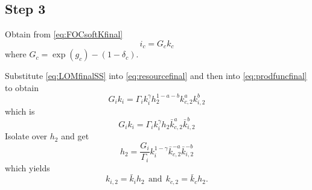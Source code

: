 \documentclass{article}
\begin{document}
\subsection*{Step 3}


Obtain from \ref{eq:FOCsoftKfinal}
\begin{equation}\label{eq:LOMfinalSS}
i_c = G_c k_c
\end{equation}
where $G_c = \exp(g_c) - (1 - \delta_c)$.

Substitute \ref{eq:LOMfinalSS} into \ref{eq:resourcefinal} and then into \ref{eq:prodfuncfinal} to obtain
$$
G_i k_i = \Gamma_{i} k_{i}^{\gamma} h_{2}^{1 - a- b} k_{c,2}^a k_{i,2}^b
$$
which is
$$
G_i k_i = \Gamma_{i} k_{i}^{\gamma} h_{2} \bar{k}_{c,2}^a \bar{k}_{i,2}^b
$$
Isolate over $h_2$ and get
\begin{equation}
h_2 = \frac{G_i}{\Gamma_i} k_i^{1 - \gamma} \bar{k}_{c,2}^{-a} \bar{k}_{i,2}^{-b}
\end{equation}
which yields
$$
k_{i,2} = \bar{k}_i h_2 \ \ \text{and} \ \ k_{c,2} = \bar{k}_c h_2.
$$
\end{document}
